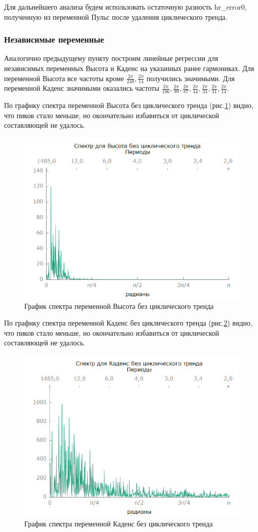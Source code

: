 \documentclass[a4paper,12pt]{article}
\begin{document}
Для дальнейшего анализа будем использовать остаточную разность hr\_error0, полученную из переменной Пульс после удаления циклического тренда.

\subsubsection{Независимые переменные}
Аналогично предыдущему пункту построим линейные регрессии для независимых переменных Высота и Каденс на указанных ранее гармониках. 
Для переменной Высота все частоты кроме $\frac{2 \pi}{248}, \frac{2 \pi}{14}$ получились значимыми. Для переменной Каденс значимыми оказались частоты $\frac{2 \pi}{106}, \frac{2 \pi}{99}, \frac{2 \pi}{87}, \frac{2 \pi}{44}, \frac{2 \pi}{33}, \frac{2 \pi}{31}, \frac{2 \pi}{14}$.

По графику спектра переменной Высота без циклического тренда (рис.\ref{fig:ele_error0_spectr}) видно, что пиков стало меньше, но окончательно избавиться от циклической составляющей не удалось.

\begin{figure}[H]
	\centering
	\includegraphics[width=0.5\linewidth]{../[graphics]/ele_error0_spectr.png}
	\caption{График спектра переменной Высота без циклического тренда}
	\label{fig:ele_error0_spectr}
\end{figure}

По графику спектра переменной Каденс без циклического тренда (рис.\ref{fig:cad_error0_spectr}) видно, что пиков стало меньше, но окончательно избавиться от циклической составляющей не удалось.

\begin{figure}[H]
	\centering
	\includegraphics[width=0.5\linewidth]{../[graphics]/cad_error0_spectr.png}
	\caption{График спектра переменной Каденс без циклического тренда}
	\label{fig:cad_error0_spectr}
\end{figure}
\end{document}
